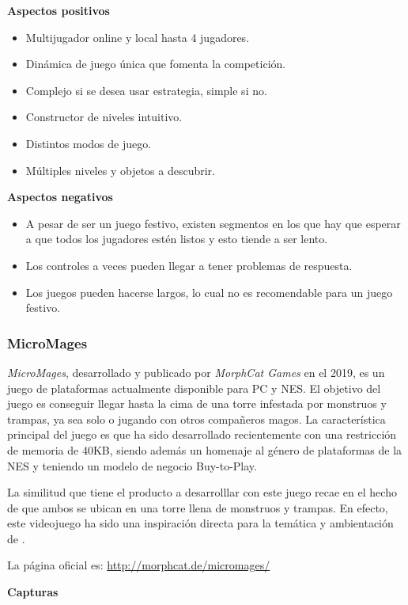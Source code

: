 \textbf{Aspectos positivos}
\begin{itemize}
    \item Multijugador online y local hasta 4 jugadores.
    \item Dinámica de juego única que fomenta la competición.
    \item Complejo si se desea usar estrategia, simple si no.
    \item Constructor de niveles intuitivo.
    \item Distintos modos de juego.
    \item Múltiples niveles y objetos a descubrir.
\end{itemize}

\textbf{Aspectos negativos}
\begin{itemize}
    \item A pesar de ser un juego festivo, existen segmentos en los que hay que
    esperar a que todos los jugadores estén listos y esto tiende a ser lento.
    \item Los controles a veces pueden llegar a tener problemas de respuesta.
    \item Los juegos pueden hacerse largos, lo cual no es recomendable para un
    juego festivo.
\end{itemize}


\subsubsection{MicroMages} \emph{MicroMages}, desarrollado y publicado por
\emph{MorphCat Games} en el 2019, es un juego de plataformas actualmente
disponible para PC y NES. El objetivo del juego es conseguir llegar hasta la
cima de una torre infestada por monstruos y trampas, ya sea solo o jugando con
otros compañeros magos. La característica principal del juego es que ha sido
desarrollado recientemente con una restricción de memoria de 40KB, siendo además
un homenaje al género de plataformas de la NES y teniendo un modelo de negocio
Buy-to-Play.

La similitud que tiene el producto a desarrolllar con este juego recae en el
hecho de que ambos se ubican en una torre llena de monstruos y trampas. En
efecto, este videojuego ha sido una inspiración directa para la temática y
ambientación de \emph{\izenburua}.

La página oficial es:
\url{http://morphcat.de/micromages/}

\textbf{Capturas}

